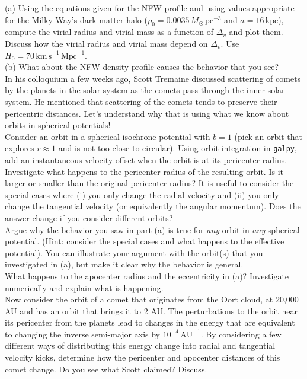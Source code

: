 \documentclass[12pt]{article}
\begin{document}
(a) Using the equations given for the NFW profile and using values
appropriate for the Milky Way's dark-matter halo ($\rho_0 =
0.0035\,M_\odot\,\mathrm{pc}^{-3}$ and $a = 16\,\mathrm{kpc}$),
compute the virial radius and virial mass as a function of $\Delta_v$
and plot them. Discuss how the virial radius and virial mass depend on
$\Delta_v$. Use $H_0 = 70\,\mathrm{km\,s}^{-1}\,\mathrm{Mpc}^{-1}$.\\

(b) What about the NFW density profile causes the behavior that you
see?\\

 In his colloquium a few weeks ago, Scott
Tremaine discussed scattering of comets by the planets in the solar
system as the comets pass through the inner solar system. He mentioned
that scattering of the comets tends to preserve their pericentric
distances. Let's understand why that is using what we know about
orbits in spherical potentials!\\

 Consider an orbit in a spherical isochrone
potential with $b=1$ (pick an orbit that explores $r \approx 1$ and is
not too close to circular). Using orbit integration in \texttt{galpy},
add an instantaneous velocity offset when the orbit is at its
pericenter radius. Investigate what happens to the pericenter radius
of the resulting orbit. Is it larger or smaller than the original
pericenter radius? It is useful to consider the special cases where
(i) you only change the radial velocity and (ii) you only change the
tangential velocity (or equivalently the angular momentum). Does the
answer change if you consider different orbits?\\

 Argue why the behavior you saw in part (a) is true
for \emph{any} orbit in \emph{any} spherical potential. (Hint:
consider the special cases and what happens to the effective
potential). You can illustrate your argument with the orbit(s) that
you investigated in (a), but make it clear why the behavior is general.\\

 What happens to the apocenter radius and the
eccentricity in (a)? Investigate numerically and explain what is
happening.\\

 Now consider the orbit of a comet that originates
from the Oort cloud, at 20,000 AU and has an orbit that brings it to 2
AU. The perturbations to the orbit near its pericenter from the
planets lead to changes in the energy that are equivalent to changing
the inverse semi-major axis by $10^{-4}\,\mathrm{AU}^{-1}$. By
considering a few different ways of distributing this energy change
into radial and tangential velocity kicks, determine how the
pericenter and apocenter distances of this comet change. Do you see
what Scott claimed? Discuss.\\
\end{document}
